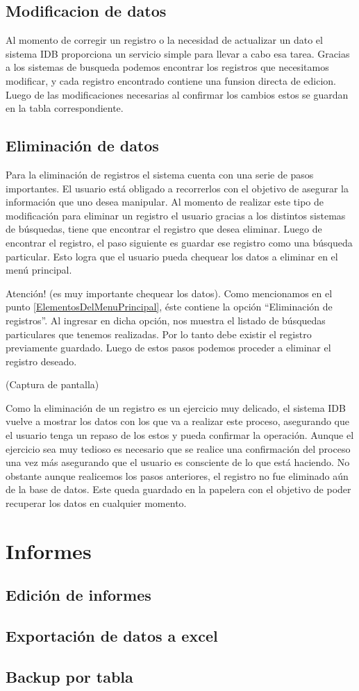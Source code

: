 \documentclass[a4paper,10pt]{article}
\begin{document}
\subsection{Modificacion de datos}

Al momento de corregir un registro o la necesidad de actualizar un dato el sistema IDB proporciona un servicio simple para llevar a cabo esa tarea. Gracias a los sistemas de busqueda podemos encontrar los registros que necesitamos modificar, y cada registro encontrado contiene una funsion directa de edicion. Luego de las modificaciones necesarias al confirmar los cambios estos se guardan en la tabla correspondiente.
 
\subsection{Eliminación de datos}

Para la eliminación de registros el sistema cuenta con una serie de pasos importantes. El usuario está obligado a recorrerlos con el objetivo de asegurar la información que uno desea manipular. Al momento de realizar este tipo de modificación para eliminar un registro el usuario gracias a los distintos sistemas de búsquedas, tiene que encontrar el registro que desea eliminar. Luego de encontrar el registro, el paso siguiente es guardar ese registro como una búsqueda particular. Esto logra que el usuario pueda chequear los datos a eliminar en el menú principal. 

Atención! (es muy importante chequear los datos). Como mencionamos en el punto \ref{ElementosDelMenuPrincipal}, éste contiene la opción “Eliminación de registros”. Al ingresar en dicha opción, nos muestra el listado de búsquedas particulares que tenemos realizadas. Por lo tanto debe existir el registro previamente guardado. Luego de estos pasos podemos proceder a eliminar el registro deseado.

(Captura de pantalla)

Como la eliminación de un registro es un ejercicio muy delicado, el sistema IDB vuelve a mostrar los datos con los que va a realizar este proceso, asegurando que el usuario tenga un repaso de los estos y pueda confirmar la operación. Aunque el ejercicio sea muy tedioso es necesario que se realice una confirmación del proceso una vez más asegurando que el usuario es consciente de lo que está haciendo. No obstante aunque realicemos los pasos anteriores, el registro no fue eliminado aún de la base de datos. Este queda guardado en la papelera con el objetivo de poder recuperar los datos en cualquier momento.

\section{Informes}
\subsection{Edición de informes}
\subsection{Exportación de datos a excel}
\subsection{Backup por tabla}
\end{document}
